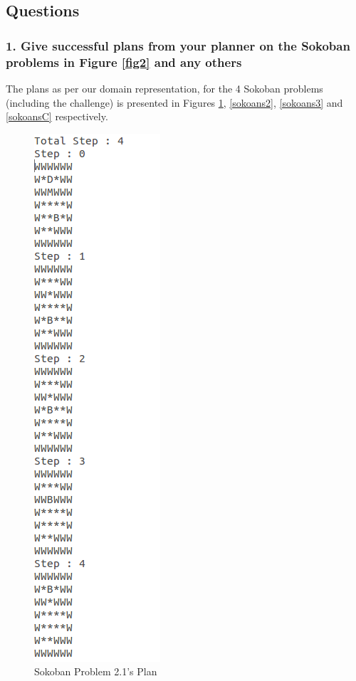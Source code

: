 \documentclass[10pt, letter]{article}
\begin{document}
\subsection{Questions}

\subsubsection*{1. Give successful plans from your planner on the Sokoban problems in Figure \ref{fig2} and any others}
The plans as per our domain representation, for the 4 Sokoban problems (including the challenge) is presented in Figures \ref{sokoans1}, \ref{sokoans2}, \ref{sokoans3} and \ref{sokoansC} respectively.
\begin{figure} [h!]
\centering
	\includegraphics[scale = 0.35]{images/sokoban1-ans}
\caption{Sokoban Problem 2.1's Plan}
\label{sokoans1}
\end{figure}
\end{document}
